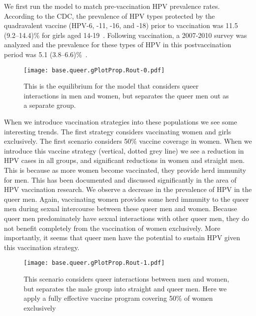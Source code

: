 \documentclass[12pt]{article}
\begin{document}
We first run the model to match pre-vaccination HPV prevalence rates.  According to the CDC, the prevalence of HPV types protected by the quadravalent vaccine (HPV-6, -11, -16, and -18) prior to vaccination was 11.5 (9.2--14.4)\% for girls aged 14-19~\cite{Markowitz:2013}.  Following vaccination, a 2007-2010 survey was analyzed and the prevalence for these types of HPV in this postvaccination period was 5.1 (3.8--6.6)\%~\cite{Markowitz:2013}.

\begin{figure}[h!]
\begin{center}
\texttt{[image: base.queer.gPlotProp.Rout-0.pdf]}
\caption{This is the equilibrium for the model that considers queer interactions in men and women, but separates the queer men out as a separate group.}
\label{fig:QueerNoVacc}
\end{center}
\end{figure}

When we introduce vaccination strategies into these populations we see some interesting trends.  The first strategy considers vaccinating women and girls exclusively.  The first scenario considers 50\% vaccine coverage in women.  When we introduce this vaccine strategy (vertical, dotted grey line) we see a reduction in HPV cases in all groups, and significant reductions in women and straight men.  This is because as more women become vaccinated, they provide herd immunity for men.  This has been documented and discussed significantly in the area of HPV vaccination research.  We observe a decrease in the prevalence of HPV in the queer men.  Again, vaccinating women provides some herd immunity to the queer men during sexual intercourse between these queer men and women.  Because queer men predominately have sexual interactions with other queer men, they do not benefit completely from the vaccination of women exclusively.  More importantly, it seems that queer men have the potential to sustain HPV given this vaccination strategy.

\begin{figure}
\begin{center}
\texttt{[image: base.queer.gPlotProp.Rout-1.pdf]}
\caption{This scenario considers queer interactions between men and women, but separates the male group into straight and queer men.  Here we apply a fully effective vaccine program covering 50\% of women exclusively}
\label{queerVaccWomen50}
\end{center}
\end{figure}
\end{document}
